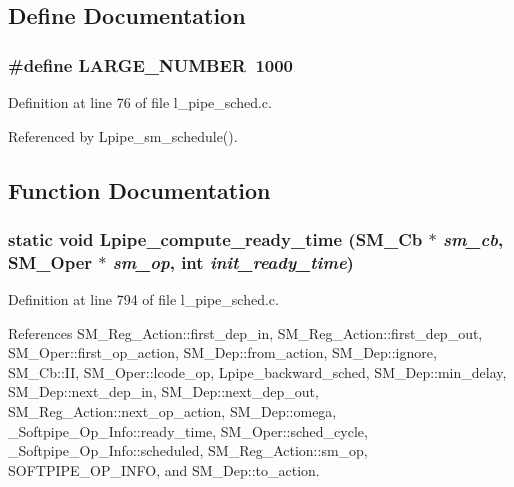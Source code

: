 \subsection{Define Documentation}
\subsubsection{\setlength{\rightskip}{0pt plus 5cm}\#define LARGE\_\-NUMBER~1000}\label{l__pipe__sched_8c_72e1d1d4b3243f4e7ec115f199298e34}




Definition at line 76 of file l\_\-pipe\_\-sched.c.

Referenced by Lpipe\_\-sm\_\-schedule().

\subsection{Function Documentation}
\subsubsection{\setlength{\rightskip}{0pt plus 5cm}static void Lpipe\_\-compute\_\-ready\_\-time (\bf{SM\_\-Cb} $\ast$ {\em sm\_\-cb}, \bf{SM\_\-Oper} $\ast$ {\em sm\_\-op}, int {\em init\_\-ready\_\-time})\hspace{0.3cm}{\tt  [static]}}\label{l__pipe__sched_8c_ef9658a964f588c28e39d72654ddfec8}




Definition at line 794 of file l\_\-pipe\_\-sched.c.

References SM\_\-Reg\_\-Action::first\_\-dep\_\-in, SM\_\-Reg\_\-Action::first\_\-dep\_\-out, SM\_\-Oper::first\_\-op\_\-action, SM\_\-Dep::from\_\-action, SM\_\-Dep::ignore, SM\_\-Cb::II, SM\_\-Oper::lcode\_\-op, Lpipe\_\-backward\_\-sched, SM\_\-Dep::min\_\-delay, SM\_\-Dep::next\_\-dep\_\-in, SM\_\-Dep::next\_\-dep\_\-out, SM\_\-Reg\_\-Action::next\_\-op\_\-action, SM\_\-Dep::omega, \_\-Softpipe\_\-Op\_\-Info::ready\_\-time, SM\_\-Oper::sched\_\-cycle, \_\-Softpipe\_\-Op\_\-Info::scheduled, SM\_\-Reg\_\-Action::sm\_\-op, SOFTPIPE\_\-OP\_\-INFO, and SM\_\-Dep::to\_\-action.

